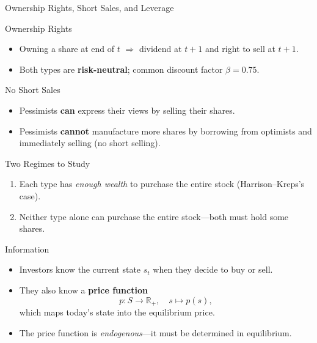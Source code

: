 \documentclass[aspectratio=169]{beamer}
\newcommand{\R}{\mathbb{R}}
\begin{document}
\begin{frame}{Ownership Rights, Short Sales, and Leverage}
  \begin{block}{Ownership Rights}
    \begin{itemize}
      \item Owning a share at end of $t$ $\Rightarrow$ dividend at $t+1$ and
            right to sell at $t+1$.
      \item Both types are \textbf{risk-neutral}; common discount factor
            $\beta=0.75$.
    \end{itemize}
  \end{block}

  \medskip
  \begin{block}{No Short Sales}
    \begin{itemize}
      \item Pessimists \textbf{can} express their views by selling their shares.
      \item Pessimists \textbf{cannot} manufacture more shares by borrowing from
            optimists and immediately selling (no short selling).
    \end{itemize}
  \end{block}

  \medskip
  \begin{block}{Two Regimes to Study}
    \begin{enumerate}
      \item Each type has \emph{enough wealth} to purchase the entire stock
            (Harrison--Kreps's case).
      \item Neither type alone can purchase the entire stock---both must hold
            some shares.
    \end{enumerate}
  \end{block}
\end{frame}

\begin{frame}{Information}
  \begin{itemize}
    \item Investors know the current state $s_t$ when they decide to buy or
          sell.
    \item They also know a \textbf{price function}
          \[
            p: S \to \R_{+}, \quad s \mapsto p(s),
          \]
          which maps today's state into the equilibrium price.
    \item The price function is \emph{endogenous}---it must be determined in
          equilibrium.
  \end{itemize}
\end{frame}
\end{document}
